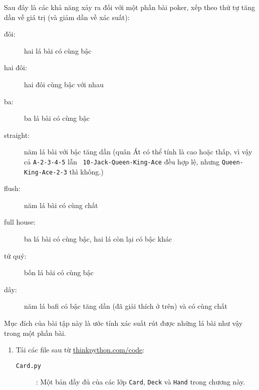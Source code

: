 \documentclass[11pt]{book}
\begin{document}
\begin{ex}


Sau đây là các khả năng xảy ra đối với một phần bài poker, xếp theo
thứ tự tăng dần về giá trị (và giảm dần về xác suất):

\begin{description}

\item[đôi:] hai lá bài có cùng bậc
\vspace{-0.05in}

\item[hai đôi:] hai đôi cùng bậc với nhau
\vspace{-0.05in}

\item[ba:] ba lá bài có cùng bậc
\vspace{-0.05in}

\item[straight:] năm lá bài với bậc tăng dần (quân Át có thể tính là
cao hoặc thấp, vì vậy cả {\tt A-2-3-4-5} lẫn {\tt
10-Jack-Queen-King-Ace} đều hợp lệ, nhưng {\tt Queen-King-Ace-2-3} thì không.)
\vspace{-0.05in}

\item[flush:] năm lá bài có cùng chất
\vspace{-0.05in}

\item[full house:] ba lá bài có cùng bậc, hai lá còn lại có bậc khác
\vspace{-0.05in}

\item[tứ quý:] bốn lá bài có cùng bậc
\vspace{-0.05in}

\item[dây:] năm lá bafi có bậc tăng dần (đã giải thích ở trên) và có
cùng chất
\vspace{-0.05in}

\end{description}
%
Mục đích của bài tập này là ước tính 
xác suất rút được những lá bài như vậy trong một phần bài.

\begin{enumerate}

\item Tải các file sau từ \url{thinkpython.com/code}:

\begin{description}

\item[{\tt Card.py}]: Một bản đầy đủ của các lớp {\tt Card},
{\tt Deck} và {\tt Hand} trong chương này.


\end{description}
\end{enumerate}
\end{ex}
\end{document}
